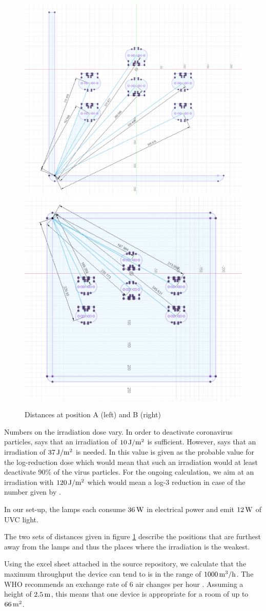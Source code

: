 \documentclass[12pt]{scrartcl}
\begin{document}
\begin{figure}
   \centering
   \includegraphics[width=0.45\linewidth]{images/PosA.png} %
   \includegraphics[width=0.45\linewidth]{images/PosB.png} %
   \caption{Distances at position A (left) and B (right)}
   \label{fig:distances}
\end{figure}

Numbers on the irradiation dose vary. 
In order to deactivate coronavirus particles, \cite {ozog}  says that an irradiation of $\unit[10]{J/m^2}$ is sufficient. However, \cite{bianco} says that an irradiation of $\unit[37]{J/m^2}$ is needed. In \cite{hessling} this value is given as the probable value for the log-reduction dose which would mean that such an irradiation would at least deactivate 90\% of the virus particles. For the ongoing calculation, we aim at an irradiation with $\unit[120]{J/m^2}$ which would mean a log-3 reduction in case of the number given by \cite{hessling}.

In our set-up, the lamps each consume $\unit[36]{W}$ in electrical power and emit $\unit[12]{W}$ of UVC light.

The two sets of distances given in figure \ref{fig:distances} describe the positions that are furthest away from the lamps and thus the places where the irradiation is the weakest.

Using the excel sheet attached in the source repository, we calculate that the maximum throughput the device can tend to is in the range of $\unit[1000]{m^3/h}$. The WHO recommends an exchange rate of 6 air changes per hour \cite{who}. Assuming a height of $\unit[2.5]{m}$, this means that one device is appropriate for a room of up to $\unit[66]{m^2}$.
\end{document}
